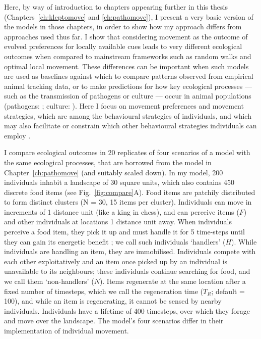 Here, by way of introduction to chapters appearing further in this thesis (Chapters~\ref{ch:kleptomove} and \ref{ch:pathomove}), I present a very basic version of the models in those chapters, in order to show how my approach differs from approaches used thus far.
I show that considering movement as the outcome of evolved preferences for locally available cues leads to very different ecological outcomes when compared to mainstream frameworks such as random walks and optimal local movement.
These differences can be important when such models are used as baselines against which to compare patterns observed from empirical animal tracking data, or to make predictions for how key ecological processes --- such as the transmission of pathogens or culture --- occur in animal populations (pathogens: \cite{white2018,white2018b,cantor2021,scherer2020}; culture: \cite{romano2020,romano2021,cantor2021,cantor2021a}).
Here I focus on movement preferences and movement strategies, which are among the behavioural strategies of individuals, and which may also facilitate or constrain which other behavioural strategies individuals can employ \citep{nathan2008a,spiegel2017}.

I compare ecological outcomes in 20 replicates of four scenarios of a model with the same ecological processes, that are borrowed from the model in Chapter~\ref{ch:pathomove} (and suitably scaled down).
In my model, 200 individuals inhabit a landscape of 30 square units, which also contains 450 discrete food items (see Fig.~\ref{fig:compare}A).
Food items are patchily distributed to form distinct clusters (N = 30, 15 items per cluster).
Individuals can move in increments of 1 distance unit (like a king in chess), and can perceive items ($F$) and other individuals at locations 1 distance unit away.
When individuals perceive a food item, they pick it up and must handle it for 5 time-steps until they can gain its energetic benefit \citep{ruxton1992,gupte2021a,gupte2022c}; we call such individuals `handlers' ($H$).
While individuals are handling an item, they are immobilised.
Individuals compete with each other exploitatively and an item once picked up by an individual is unavailable to its neighbours; these individuals continue searching for food, and we call them `non-handlers' ($N$).
Items regenerate at the same location after a fixed number of timesteps, which we call the regeneration time ($T_R$; default = 100), and while an item is regenerating, it cannot be sensed by nearby individuals.
Individuals have a lifetime of 400 timesteps, over which they forage and move over the landscape.
The model's four scenarios differ in their implementation of individual movement.

